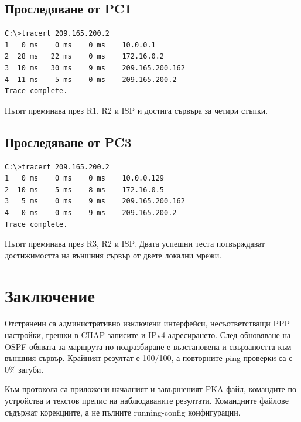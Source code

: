 \documentclass[12pt]{article}
\begin{document}
\subsection{Проследяване от PC1}
\begin{lstlisting}
C:\>tracert 209.165.200.2
1   0 ms    0 ms    0 ms    10.0.0.1
2  28 ms   22 ms    0 ms    172.16.0.2
3  10 ms   30 ms    9 ms    209.165.200.162
4  11 ms    5 ms    0 ms    209.165.200.2
Trace complete.
\end{lstlisting}
Пътят преминава през R1, R2 и ISP и достига сървъра за четири стъпки.

\subsection{Проследяване от PC3}
\begin{lstlisting}
C:\>tracert 209.165.200.2
1   0 ms    0 ms    0 ms    10.0.0.129
2  10 ms    5 ms    8 ms    172.16.0.5
3   5 ms    0 ms    9 ms    209.165.200.162
4   0 ms    0 ms    9 ms    209.165.200.2
Trace complete.
\end{lstlisting}
Пътят преминава през R3, R2 и ISP. Двата успешни теста потвърждават достижимостта на външния сървър от двете локални мрежи.

\section{Заключение}
Отстранени са административно изключени интерфейси, несъответстващи PPP настройки, грешки в CHAP записите и IPv4 адресирането. След обновяване на OSPF обявата за маршрута по подразбиране е възстановена и свързаността към външния сървър. Крайният резултат е 100/100, а повторните ping проверки са с 0\% загуби.

Към протокола са приложени началният и завършеният PKA файл, командите по устройства и текстов препис на наблюдаваните резултати. Командните файлове съдържат корекциите, а не пълните running-config конфигурации.
\end{document}
